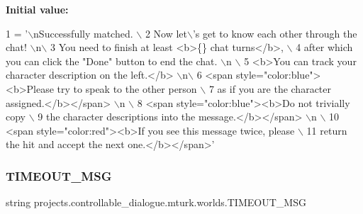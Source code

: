 {\bfseries Initial value\+:}
\begin{DoxyCode}
1 =  \textcolor{stringliteral}{'\(\backslash\)nSuccessfully matched. \(\backslash\)}
2 \textcolor{stringliteral}{        Now let\(\backslash\)'s get to know each other through the chat! \(\backslash\)n\(\backslash\)}
3 \textcolor{stringliteral}{        You need to finish at least <b>\{\} chat turns</b>, \(\backslash\)}
4 \textcolor{stringliteral}{        after which you can click the "Done" button to end the chat. \(\backslash\)n \(\backslash\)}
5 \textcolor{stringliteral}{        <b>You can track your character description on the left.</b> \(\backslash\)n\(\backslash\)}
6 \textcolor{stringliteral}{        <span style="color:blue"><b>Please try to speak to the other person \(\backslash\)}
7 \textcolor{stringliteral}{        as if you are the character assigned.</b></span> \(\backslash\)n \(\backslash\)}
8 \textcolor{stringliteral}{        <span style="color:blue"><b>Do not trivially copy \(\backslash\)}
9 \textcolor{stringliteral}{        the character descriptions into the message.</b></span> \(\backslash\)n \(\backslash\)}
10 \textcolor{stringliteral}{        <span style="color:red"><b>If you see this message twice, please \(\backslash\)}
11 \textcolor{stringliteral}{        return the hit and accept the next one.</b></span>'}
\end{DoxyCode}
\mbox{\label{namespaceprojects_1_1controllable__dialogue_1_1mturk_1_1worlds_a0dbdd5f376e76791bb0860e586d1a198}} 
\subsubsection{\texorpdfstring{T\+I\+M\+E\+O\+U\+T\+\_\+\+M\+SG}{TIMEOUT\_MSG}}
{\footnotesize\ttfamily string projects.\+controllable\+\_\+dialogue.\+mturk.\+worlds.\+T\+I\+M\+E\+O\+U\+T\+\_\+\+M\+SG}

